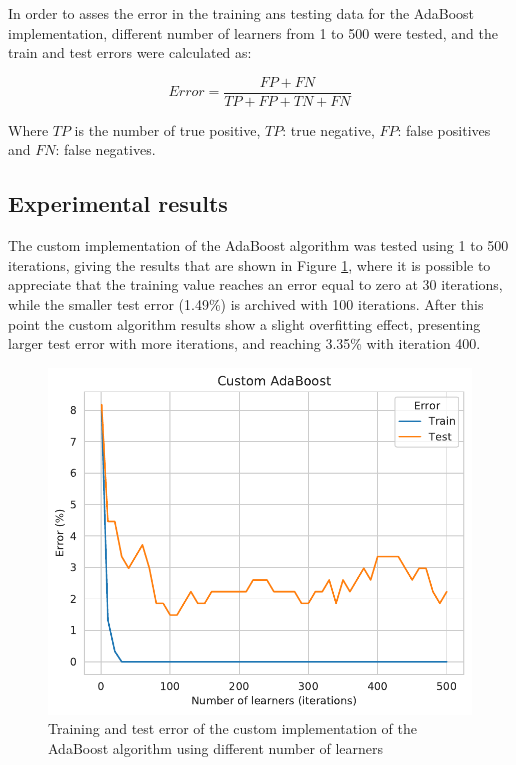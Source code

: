 \documentclass[11pt,twocolumn,letterpaper]{article}
\begin{document}
In order to asses the error in the training ans testing data for the AdaBoost implementation, different number of learners from 1 to 500 were tested, and the train and test errors were calculated as:

\begin{equation}
	Error = \frac{FP+FN}{TP+FP+TN+FN}
\end{equation}

Where $TP$ is the number of true positive, $TP$: true negative, $FP$: false positives and $FN$: false negatives.


\subsection{Experimental results}

The custom implementation of the AdaBoost algorithm was tested using 1 to 500 iterations, giving the results that are shown in Figure \ref{fig:nlearners_adaboost_custom}, where it is possible to appreciate that the training value reaches an error equal to zero at 30 iterations, while the smaller test error (1.49\%) is archived with 100 iterations. After this point the custom algorithm results show a slight overfitting effect, presenting larger test error with more iterations, and reaching 3.35\% with iteration 400.

\begin{figure}[h]
	\begin{center}
		\includegraphics[width=1.0\linewidth]{nlearners_adaboost_custom.pdf}
		\caption{Training and test error of the custom implementation of the AdaBoost algorithm using different number of learners}
		\label{fig:nlearners_adaboost_custom}
	\end{center}
\end{figure}
\end{document}
